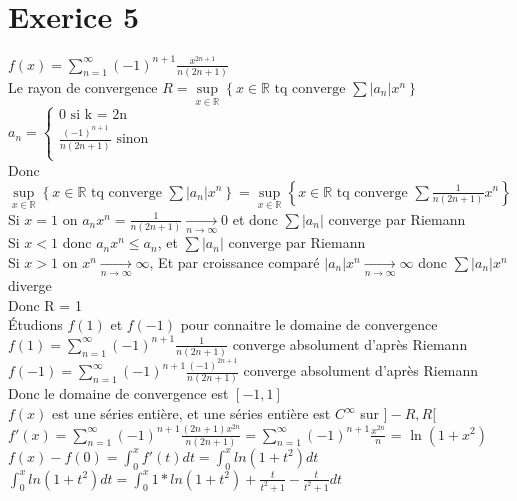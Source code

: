 \documentclass{article}
\author{Frederic Becerril}
\newcommand{\mylim}[2]{\underset{#1 \rightarrow #2}{\longrightarrow}}
\newcommand{\mysupp}[1]{\underset{x \in #1}{\sup}}
\begin{document}
\part*{Exerice 5}

$f(x) = \sum_{n=1}^{\infty} (-1)^{n+1} \frac{x^{2n  + 1}}{n(2n + 1)}$\\
Le rayon de convergence $R = \mysupp{\mathbb{R}} \left\{x \in \mathbb{R} \mbox{ tq converge }\sum |a_n|x^n \right\}$\\
$a_n = \left\{
    \begin{array}{ll}
        0 \mbox{ si k = 2n}\\
        \frac{(-1)^{n + 1}}{n(2n + 1)} \mbox{ sinon}\\
    \end{array}
\right.$\\
Donc $ \mysupp{\mathbb{R}} \left\{x \in \mathbb{R} \mbox{ tq converge }\sum |a_n|x^n \right\} =  \mysupp{\mathbb{R}} \left\{x \in \mathbb{R} \mbox{ tq converge }\sum \frac{1}{n(2n + 1)}x^n \right\}$\\
Si $x = 1$ on $a_n x^n = \frac{1}{n(2n + 1)} \mylim{n}{\infty} 0$ et donc $\sum |a_n|$ converge par Riemann\\
Si $x < 1$ donc $a_n x^n \leq a_n$, et $\sum |a_n|$ converge par Riemann\\
Si $x > 1$ on $x^n \mylim{n}{\infty} \infty$, Et par croissance comparé $|a_n|x^n \mylim{n}{\infty} \infty$ donc $\sum |a_n|x^n$ diverge\\
Donc R = 1\\
Étudions $f(1)$ et $f(-1)$ pour connaitre le domaine de convergence\\
$f(1) = \sum_{n=1}^{\infty} (-1)^{n+1} \frac{1}{n(2n + 1)}$ converge absolument d'après Riemann\\
$f(-1) = \sum_{n=1}^{\infty} (-1)^{n+1} \frac{(-1)^{2n+1}}{n(2n + 1)}$ converge absolument d'après Riemann\\
Donc le domaine de convergence est $[-1, 1]$\\
$f(x)$ est une séries entière, et une séries entière est $C^\infty$ sur $]-R, R[$\\
$f'(x) = \sum_{n=1}^{\infty} (-1)^{n+1} \frac{(2n + 1)x^{2n}}{n(2n + 1)} = \sum_{n=1}^{\infty} (-1)^{n+1} \frac{x^{2n}}{n}$ = $\ln(1 + x^2)$\\
$f(x) - f(0) = \int_0^x f'(t) dt = \int_0^x ln(1 + t^2) dt$\\ 
$\int_0^x ln(1 + t^2)dt = \int_0^x 1 * ln(1 + t^2) + \frac{t}{t^2 + 1} - \frac{t}{t^2 + 1}dt$\\
\end{document}
